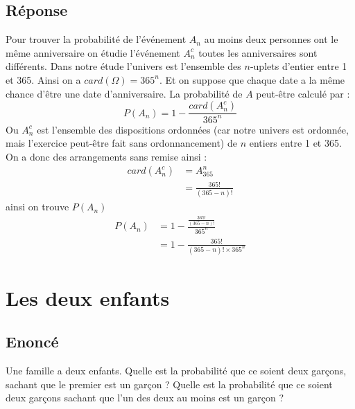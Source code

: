 \documentclass[10pt,a4paper,twoside]{article}
\begin{document}
\subsection*{Réponse}
Pour trouver la probabilité de l'événement $A_{n}$ au moins deux personnes ont le même anniversaire on étudie l'événement $A_{n}^{c}$ toutes les anniversaires sont différents. Dans notre étude l'univers est l'ensemble des $n$-uplets d'entier entre 1 et 365. Ainsi on a $card(\Omega)=365^{n}$. Et on suppose que chaque date a la même chance d'être une date d'anniversaire. La probabilité de $A$ peut-être calculé par :
\[ P(A_{n}) = 1-\frac{card(A_{n}^{c})}{365^{n}} \]
Ou $A_{n}^{c}$ est l'ensemble des dispositions ordonnées (car notre univers est ordonnée, mais l'exercice peut-être fait sans ordonnancement) de $n$ entiers entre 1 et 365. On a donc des arrangements sans remise ainsi :
\begin{align*}
card(A_{n}^{c}) &= A^{n}_{365}\\
 & = \frac{365!}{(365-n)!}
\end{align*}
ainsi on trouve $P(A_{n})$
\begin{align*}
P(A_{n}) & =1-\frac{\frac{365!}{(365-n)!}}{365^{n}}\\
  & = 1-\frac{365!}{(365-n)!\times 365^{n}}
\end{align*}


\section{Les deux enfants}
\subsection*{Enoncé}
Une famille a deux enfants. Quelle est la probabilité que ce soient deux garçons, sachant que le premier est un garçon ? Quelle est la probabilité que ce soient deux garçons sachant que l'un des deux au moins est un garçon ?
\end{document}
